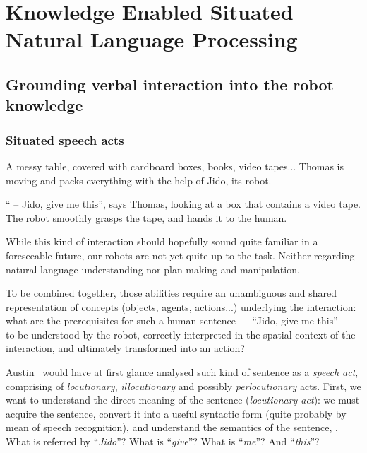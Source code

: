 \chapter{Knowledge Enabled Situated Natural Language Processing}
\label{chapt|dialogs}



\section{Grounding verbal interaction into the robot knowledge}
\label{sect|dialogs}

\subsection{Situated speech acts}
\label{intro_example}

A messy table, covered with cardboard boxes, books, video tapes... Thomas is
moving and packs everything with the help of Jido, its robot.

`` -- Jido, give me this'', says Thomas, looking at a box that contains a video
tape. The robot smoothly grasps the tape, and hands it to the human.

While this kind of interaction should hopefully sound quite familiar in a
foreseeable future, our robots are not yet quite up to the task. Neither
regarding natural language understanding nor plan-making and manipulation.

To be combined together, those abilities require an unambiguous and shared
representation of concepts (objects, agents, actions...) underlying the
interaction: what are the prerequisites for such a
human sentence --- ``Jido, give me this'' --- to be understood by the robot,
correctly interpreted in the spatial context of the interaction, and ultimately
transformed into an action?

Austin~\cite{Austin1962} would have at first glance analysed such kind of
sentence as a \emph{speech act}, comprising of \emph{locutionary},
\emph{illocutionary} and possibly \emph{perlocutionary} acts. First, we want to
understand the direct meaning of the sentence (\emph{locutionary act}): we must
acquire the sentence, convert it into a useful syntactic form (quite probably
by mean of speech recognition), and understand the semantics of the sentence,
\ie, What is referred by ``\textit{Jido}''? What is ``\textit{give}''? What is
``\textit{me}''? And ``\textit{this}''?

